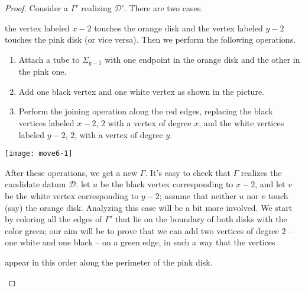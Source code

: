 \documentclass{article}
\begin{document}
\begin{proof}
Consider a \dessin{} $\Gamma'$ realizing $\mathcal{D}'$. There are two cases.
\begin{manycases}
\case the vertex labeled $x-2$ touches the orange disk and the vertex labeled $y-2$ touches the pink disk (or vice versa). Then we perform the following operations.
\begin{enumerate}
\item Attach a tube to $\Sigma_{g-1}$ with one endpoint in the orange disk and the other in the pink one.
\item Add one black vertex and one white vertex as shown in the picture.
\item Perform the joining operation along the red edges, replacing the black vertices labeled $x-2$, $2$ with a vertex of degree $x$, and the white vertices labeled $y-2$, $2$, with a vertex of degree $y$.
\end{enumerate}
\begin{center}
\texttt{[image: move6-1]}
\end{center}
After these operations, we get a new \dessin{} $\Gamma$. It's easy to check that $\Gamma$ realizes the candidate datum $\mathcal{D}$.
\case let $u$ be the black vertex corresponding to $x-2$, and let $v$ be the white vertex corresponding to $y-2$; assume that neither $u$ nor $v$ touch (say) the orange disk. Analyzing this case will be a bit more involved. We start by coloring all the edges of $\Gamma'$  that lie on the boundary of both disks with the color green; our aim will be to prove that we can add two vertices of degree $2$ -- one white and one black -- on a green edge, in such a way that the vertices
\begin{center}
\end{center}
appear in this order along the perimeter of the pink disk.


\end{manycases}
\end{proof}
\end{document}
